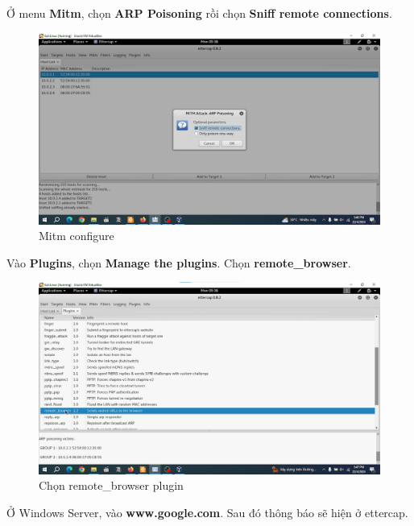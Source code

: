 \newpage

 Ở menu \textbf{Mitm}, chọn \textbf{ARP Poisoning} rồi chọn \textbf{Sniff remote connections}. 

\begin{figure}[!htb]
    \centering
    \includegraphics[width=1\linewidth]{figure//chapter5//lab5_4/mitm.png}
    \caption{Mitm configure}
    \label{fig:enter-label}
\end{figure}

 Vào \textbf{Plugins}, chọn \textbf{Manage the plugins}. Chọn \textbf{remote\_browser}.

\begin{figure}[!htb]
    \centering
    \includegraphics[width=1\linewidth]{figure//chapter5//lab5_4/remote_browser.png}
    \caption{Chọn remote\_browser plugin}
    \label{fig:enter-label}
\end{figure}

\newpage

 Ở Windows Server, vào \textbf{www.google.com}. Sau đó thông báo sẽ hiện ở ettercap.

